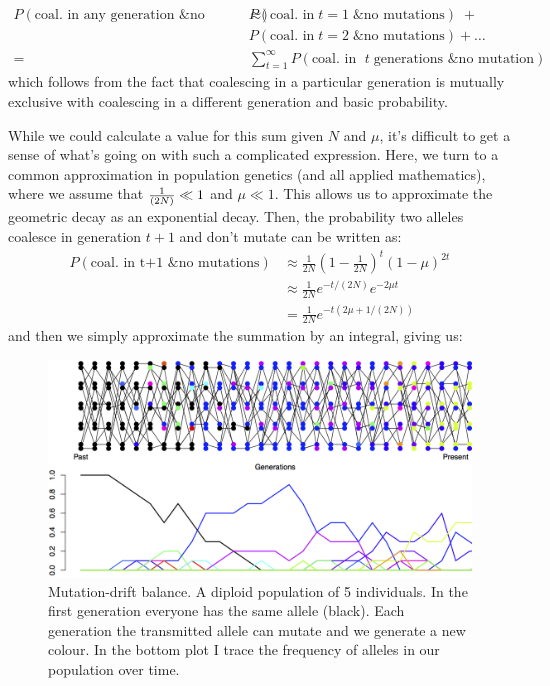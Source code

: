 \begin{align*}
  P(\textrm{coal. in any generation \& no mutations}) \approx & P(\textrm{coal. in} \; t=1 \; \textrm{\& no mutations}) \; + \\ 
&  P(\textrm{coal. in} \; t=2 \; \textrm{\& no mutations}) + \ldots \\
  = & \sum_{t=1}^\infty P(\textrm{coal. in } \; t \; \textrm{generations \& no mutation})
\end{align*}
%
which follows from the fact that coalescing in a particular generation is
mutually exclusive with coalescing in a different generation and basic probability.

While we could calculate a value for this sum given $N$ and $\mu$, it's
difficult to get a sense of what's going on with such a complicated expression.
Here, we turn to a common approximation in population genetics (and all applied
mathematics), where we assume that $\nicefrac{1}{(2N)} \ll 1$ and $\mu \ll 1$.
This allows us to approximate the geometric decay as an exponential decay.
Then, the probability two alleles coalesce in generation $t+1$ and don't mutate
can be written as:
%
\begin{align} P(\textrm{coal. in t+1 \& no mutations}) &\approx \frac{1}{2N}
\left(1- \frac{1}{2N} \right)^t \left(1-\mu \right)^{2t} \\ 
& \approx \frac{1}{2N} e^{-t/(2N)} e^{-2\mu t } \\
&=\frac{1}{2N} e^{-t(2\mu+1/(2N))} \end{align} 
%
and then we simply approximate the summation by an integral, giving us:
%
\begin{figure} \begin{center} \includegraphics[width= 0.8
\textwidth]{figures/Mut_drift_balance.png} \end{center} \caption{Mutation-drift
balance. A diploid population of 5 individuals. In the first generation
everyone has the same allele (black). Each generation the transmitted allele
can mutate and we generate a new colour. In the bottom plot I trace the
frequency of alleles in our population over time.} \label{fig:Mut_Sel_balance}
\end{figure} 

